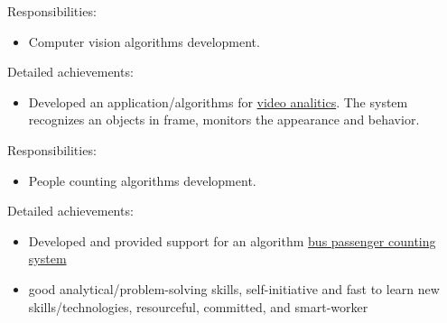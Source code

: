 \documentclass[a4paper,11pt]{memoir}
\begin{document}
{
Responsibilities:
\begin{itemize}
	\item Computer vision algorithms development.
\end{itemize}
Detailed achievements:
\begin{itemize}
	\item Developed an application/algorithms for \href{https://en.videomatrix.ru/vmx-sila/}{video analitics}. The system \mbox{recognizes} an objects in frame, monitors the appearance and behavior.
\end{itemize}
}

{Responsibilities:
\begin{itemize}
	\item People counting algorithms development.
\end{itemize}
Detailed achievements:
\begin{itemize}
	\item Developed and provided support for an algorithm \href{https://www.youtube.com/watch?v=acb3HhLy3sA}{bus passenger counting system}
\end{itemize}
}

\Sep %

\clearpage %

\userinformation
\framebreak


\begin{itemize}
	\item  good analytical/problem-solving skills, self-initiative and fast to learn new skills/technologies, resourceful, committed, and smart-worker
\end{itemize}
\Sep



\end{document}

